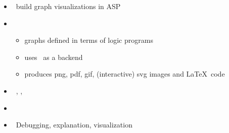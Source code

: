 \begin{frame}{\clingraph}
  \begin{itemize}
    \item {} \ build graph visualizations in ASP
    \item {}
      \begin{itemize}
      \item graphs defined in terms of logic programs %
      \item uses \graphviz\ as a backend
      \item produces png, pdf, gif, (interactive) svg images and \LaTeX\ code
      \end{itemize}
    \item {}   \ \clingo, \clorm, \graphviz
    \item {}   \ \cite{hasascst22a}
    \item {} \ Debugging, explanation, visualization %
  \end{itemize}
\end{frame}
%
